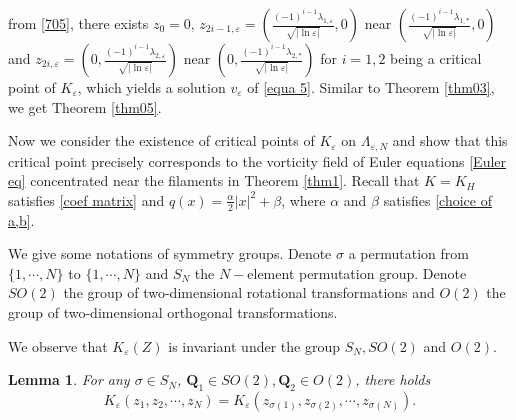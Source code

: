 \documentclass[12pt,reqno]{amsart}
\numberwithin{equation}{section}
\newtheorem{lemma}[theorem]{Lemma}
\theoremstyle{definition}
\theoremstyle{remark}
\begin{document}
from \eqref{705}, there exists $ z_0=0 $, $ z_{2i-1,\varepsilon}=\left( \frac{(-1)^{i-1}\lambda_{1,\varepsilon}}{\sqrt{|\ln\varepsilon|}},0\right)  $ near $ \left( \frac{(-1)^{i-1}\lambda_{1,*}}{\sqrt{|\ln\varepsilon|}},0\right) $ and $ z_{2i,\varepsilon}=\left( 0,\frac{(-1)^{i-1}\lambda_{2,\varepsilon}}{\sqrt{|\ln\varepsilon|}}\right)  $ near $ \left( 0,\frac{(-1)^{i-1}\lambda_{2,*}}{\sqrt{|\ln\varepsilon|}}\right) $ for $ i=1,2 $ being a critical point of $ K_\varepsilon  $, which yields a solution $ v_\varepsilon $ of \eqref{equa 5}.   Similar to Theorem \ref{thm03}, we get Theorem \ref{thm05}.








\iffalse

Now we consider the existence of critical points of $ K_\varepsilon $ on $ \Lambda_{\varepsilon, N} $ and show that this critical point precisely corresponds to the vorticity field of Euler equations \eqref{Euler eq} concentrated near the filaments in Theorem \ref{thm1}. Recall that $ K=K_H $ satisfies \eqref{coef matrix} and $ q(x)=\frac{\alpha}{2}|x|^2+\beta $, where $ \alpha $ and $ \beta $ satisfies \eqref{choice of a,b}.

We give some notations of symmetry groups. Denote $ \sigma $ a permutation from $ \{1,\cdots,N\} $ to $ \{1,\cdots,N\} $ and  $ S_N  $ the $ N-$element permutation group.
Denote $ SO(2) $ the group of two-dimensional rotational transformations and $ O(2) $ the group of two-dimensional orthogonal  transformations.  

We observe that $ K_\varepsilon(Z) $ is invariant under the group $ S_N, SO(2) $ and $ O(2) $. 
\begin{lemma}
For any $ \sigma\in S_N $, $ \textbf{Q}_1\in SO(2), \textbf{Q}_2\in O(2) $, there holds
\begin{equation*} 
K_\varepsilon(z_1,z_2,\cdots, z_N)=K_\varepsilon(z_{\sigma(1)},z_{\sigma(2)},\cdots, z_{\sigma(N)}).
\end{equation*}
\end{lemma}
\end{document}
